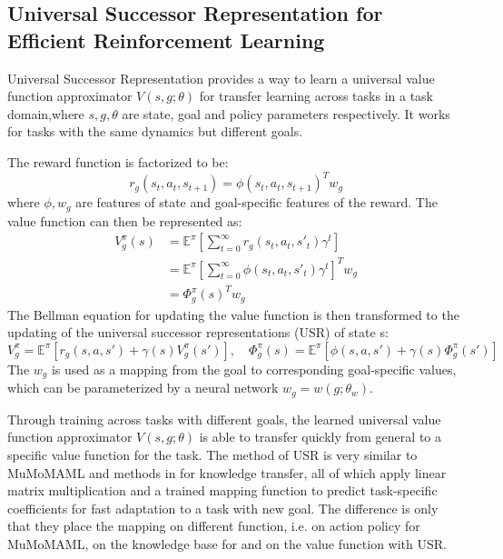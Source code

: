 \documentclass{article}
\begin{document}
\subsection{Universal Successor Representation for Efficient Reinforcement Learning}
Universal Successor Representation \cite{ma2018universal} provides a way to learn a universal value function approximator $V(s,g;\theta)$ for transfer learning across tasks in a task domain,where $s,g, \theta$ are state, goal and policy parameters respectively. It works for tasks with the same dynamics but different goals.

The reward function is factorized to be:
\begin{equation}
    r_g(s_t,a_t,s_{t+1})=\phi(s_t,a_t,s_{t+1})^T w_g
\end{equation}
where $\phi, w_g$ are features of state and goal-specific features of the reward. The value function can then be represented as:
\begin{equation}
\begin{aligned}
    V^\pi_g(s)&=\mathbb{E}^\pi[\sum_{t=0}^\infty r_g(s_t,a_t,s'_t)\gamma^t]\\
    &=\mathbb{E}^\pi[\sum_{t=0}^\infty \phi(s_t,a_t,s'_t)\gamma^t]^T w_g\\
    &=\Phi_g^\pi(s)^T w_g
\end{aligned}
\end{equation}
The Bellman equation for updating the value function is then transformed to the updating of the universal successor representations (USR) of state s:
\begin{equation}
    V_g^\pi=\mathbb{E}^\pi[r_g(s,a,s')+\gamma(s)V_g^\pi(s')],\quad \Phi_g^\pi(s)=\mathbb{E}^\pi[\phi(s,a,s')+\gamma(s)\Phi_g^\pi(s')]
\end{equation}
The $w_g$ is used as a mapping from the goal to corresponding goal-specific values, which can be parameterized by a neural network $w_g=w(g;\theta_w)$.

Through training across tasks with different goals, the learned universal value function approximator $V(s,g;\theta)$ is able to transfer quickly from general to a specific value function for the task. The method of USR is very similar to MuMoMAML \cite{vuorio2018toward} and methods in \cite{ammar2015autonomous} for knowledge transfer, all of which apply linear matrix multiplication and a trained mapping function to predict task-specific coefficients for fast adaptation to a task with new goal. The difference is only that they place the mapping on different function, i.e. on action policy for MuMoMAML, on the knowledge base for \cite{ammar2015autonomous} and on the value function with USR.
\end{document}
